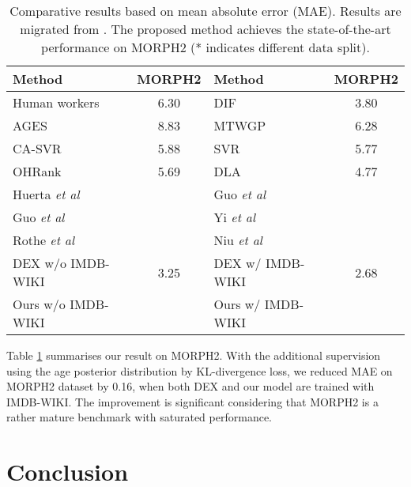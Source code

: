 \documentclass{bmvc2k}
\def\etal{\emph{et al}\bmvaOneDot}
\begin{document}
\begin{table}[h]
	\small
	\begin{center}
		\caption{Comparative results based on mean absolute error (MAE). Results are migrated from \cite{rothe2016deep}. The proposed method achieves the state-of-the-art performance on MORPH2 (* indicates different data split).}
\begin{tabular}{l|c||l|c}
		\hline

			Method &  MORPH2\cite{ricanek2006morph}  & Method &  MORPH2\cite{ricanek2006morph} \\
			\hline 
			Human workers\cite{han2015demographic} & 6.30  &DIF\cite{han2015demographic}	& 3.80  \\
			AGES\cite{geng2007automatic} & 8.83  &MTWGP\cite{zhang2010multi} & 6.28  \\
			CA-SVR\cite{chen2013cumulative} & 5.88  &SVR\cite{guo2008image} & 5.77  \\
			OHRank\cite{chang2011ordinal} & 5.69  &DLA\cite{wang2015deeply} & 4.77  \\
			Huerta \etal~\cite{huerta2014facial} &   &Guo \etal~\cite{guo2011simultaneous} &   \\
			Guo \etal~\cite{guo2014framework} &   &Yi \etal~\cite{yi2014age} &   \\
			Rothe \etal~\cite{rothe2016some} &   & 
			Niu \etal~\cite{niu2016ordinal} &  \\ \hline \hline
			DEX w/o IMDB-WIKI~\cite{rothe2016deep} & 3.25  &DEX w/ IMDB-WIKI~\cite{rothe2016deep} & 2.68  \\ 
			Ours w/o IMDB-WIKI &   & 
			Ours w/ IMDB-WIKI &  \\ \hline
		\end{tabular}
		\label{tab:MORPH2}
	\end{center}
\end{table}


Table \ref{tab:MORPH2} summarises our result on MORPH2. With the additional supervision using the age posterior distribution by KL-divergence loss, we reduced MAE on MORPH2 dataset by 0.16, when both DEX and our model are trained with IMDB-WIKI. The improvement is significant considering that MORPH2 is a rather mature benchmark with saturated performance. 




\section{Conclusion}
\end{document}
